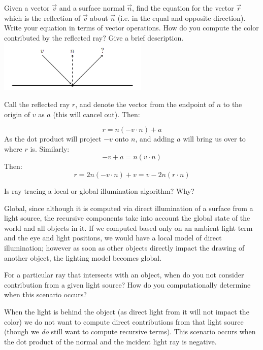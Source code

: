 \documentclass[10pt,twocolumn]{article}
\begin{document}
\begin{framed}
\noindent{\bf[2 points]} Given a vector $\vec{v}$ and a surface normal $\vec{n}$, find the equation for the vector $\vec{r}$ which is the reflection of $\vec{v}$ about $\vec{n}$ (i.e. in the equal and opposite direction). Write your equation in terms of vector operations. How do you compute the color contributed by the reflected ray? Give a brief description.
\includegraphics[width=2.8in]{reflection.png}

Call the reflected ray $r$, and denote the vector from the endpoint of $n$ to the origin of $v$ as $a$ (this will cancel out). Then:

\[r = n (-v \cdot n) + a\]
As the dot product will project $-v$ onto $n$, and adding $a$ will bring us over to where $r$ is. Similarly:
\[-v + a = n (v \cdot n)\]
Then:
\[r = 2 n (-v \cdot n) + v = v - 2 n (r \cdot n) \]

\end{framed}

\begin{framed}
\noindent{\bf[1 point]} Is ray tracing a local or global illumination algorithm? Why?

Global, since although it is computed via direct illumination of a surface from a light source, the recursive components take into account the global state of the world and all objects in it. If we computed based only on an ambient light term and the eye and light positions, we would have a local model of direct illumination; however as soon as other objects directly impact the drawing of another object, the lighting model becomes global.
\end{framed}

\begin{framed}
\noindent{\bf[1 point]} For a particular ray that intersects with an object, when do you not consider contribution from a given light source? How do you computationally determine when this scenario occurs?

When the light is behind the object (as direct light from it will not impact the color) we do not want to compute direct contributions from that light source (though we \textit{do} still want to compute recursive terms). This scenario occurs when the dot product of the normal and the incident light ray is negative.
\end{framed}
\end{document}
